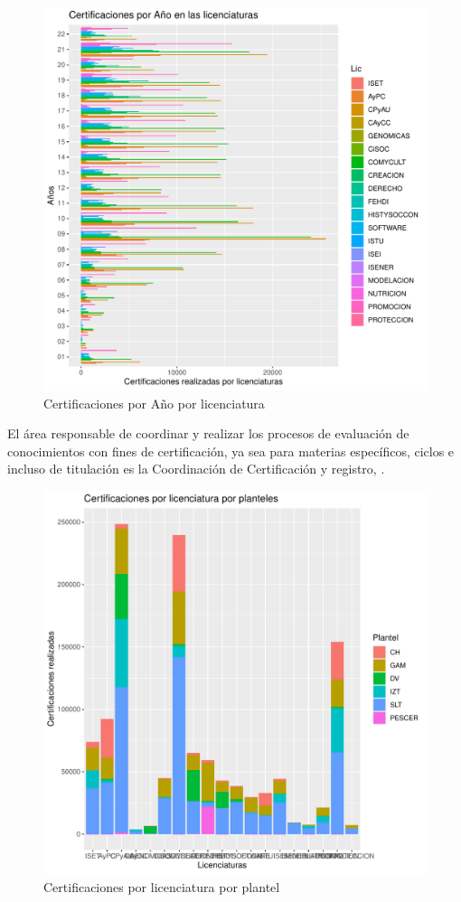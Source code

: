 \documentclass[12pt]{article}
\begin{document}
\begin{figure}
\centering
\includegraphics[scale=0.45]{Graficas/ggplotBarplotAnhoLic2.pdf}
\caption{Certificaciones por A\~no por licenciatura}
\label{Fig.Cert.Anho-Lic2}
\end{figure}


El \'area responsable de coordinar y realizar los procesos de evaluaci\'on de conocimientos con fines de certificaci\'on, ya sea para materias espec\'ificos, ciclos e incluso de titulaci\'on es la Coordinaci\'on de Certificaci\'on y registro, \cite{ProyectoEducativo}.


\begin{figure}
\centering
\includegraphics[scale=0.45]{Graficas/ggplotBarplotLicPlantel.pdf}
\caption{Certificaciones por licenciatura por plantel}
\label{Fig.Cert.Lic-Plantel}
\end{figure}
\end{document}
